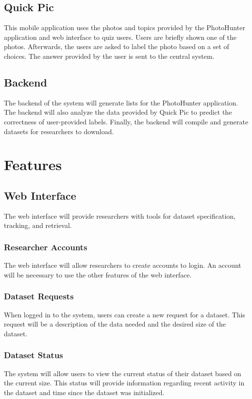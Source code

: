 \documentclass{article}
\begin{document}
\subsection{Quick Pic}
This mobile application uses the photos and topics provided by the PhotoHunter
application and web interface to quiz users. Users are briefly shown one of the
photos. Afterwards, the users are asked to label the photo based on a set of
choices. The answer provided by the user is sent to the central system. 

\subsection{Backend}
The backend of the system will generate lists for the PhotoHunter application.
The backend will also analyze the data provided by Quick Pic to predict the
correctness of user-provided labels. Finally, the backend will compile and
generate datasets for researchers to download.

\section{Features}

\subsection{Web Interface}
The web interface will provide researchers with tools for dataset
specification, tracking, and retrieval. 

	\subsubsection{Researcher Accounts}
  The web interface will allow researchers to create accounts to login. An
  account will be necessary to use the other features of the web interface.
	
	\subsubsection{Dataset Requests}
  When logged in to the system, users can create a new request for a dataset.
  This request will be a description of the data needed and the desired size of
  the dataset.
	
	\subsubsection{Dataset Status}
  The system will allow users to view the current status of their dataset based
  on the current size. This status will provide information regarding recent
  activity in the dataset and time since the dataset was initialized. 
	
\end{document}
